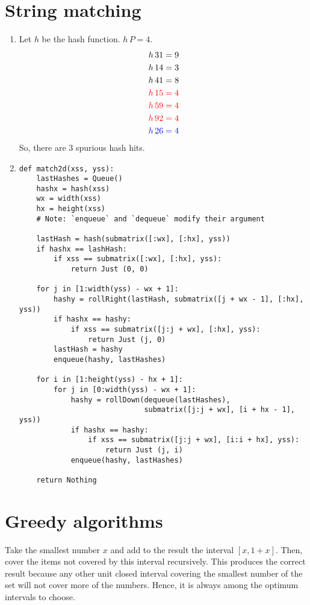 \documentclass[11pt]{article}
\begin{document}
\section{String matching}
\begin{enumerate}
\item
  Let \(h\) be the hash function. \(h\,P=4\).
  \[\begin{aligned}
    h\,31&=9                         \\
    h\,14&=3                         \\
    h\,41&=8                         \\
    \color{red}h\,15&\color{red}=4   \\
    \color{red}h\,59&\color{red}=4   \\
    \color{red}h\,92&\color{red}=4   \\
    \color{blue}h\,26&\color{blue}=4 \\
  \end{aligned}\]
  So, there are 3 spurious hash hits.
\item
  \begin{minipage}[t]{\linewidth}
    \begin{lstlisting}[basicstyle=\tiny]
def match2d(xss, yss):
    lastHashes = Queue()
    hashx = hash(xss)
    wx = width(xss)
    hx = height(xss)
    # Note: `enqueue` and `dequeue` modify their argument

    lastHash = hash(submatrix([:wx], [:hx], yss))
    if hashx == lashHash:
        if xss == submatrix([:wx], [:hx], yss):
            return Just (0, 0)

    for j in [1:width(yss) - wx + 1]:
        hashy = rollRight(lastHash, submatrix([j + wx - 1], [:hx], yss))
        if hashx == hashy:
            if xss == submatrix([j:j + wx], [:hx], yss):
                return Just (j, 0)
        lastHash = hashy
        enqueue(hashy, lastHashes)

    for i in [1:height(yss) - hx + 1]:
        for j in [0:width(yss) - wx + 1]:
            hashy = rollDown(dequeue(lastHashes),
                             submatrix([j:j + wx], [i + hx - 1], yss))
            if hashx == hashy:
                if xss == submatrix([j:j + wx], [i:i + hx], yss):
                    return Just (j, i)
            enqueue(hashy, lastHashes)

    return Nothing
    \end{lstlisting}
  \end{minipage}
\end{enumerate}

\section{Greedy algorithms}
Take the smallest number \(x\) and add to the result the interval \([x,1+x]\). Then, cover the items not covered by this interval recursively. This produces the correct result because any other unit closed interval covering the smallest number of the set will not cover more of the numbers. Hence, it is always among the optimum intervals to choose.
\end{document}
